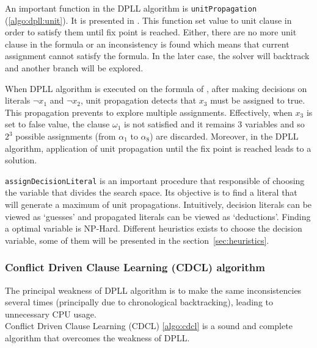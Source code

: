 

An important function in the DPLL algorithm is \texttt{unitPropagation} (\cref{algo:dpll:unit}).
It is presented in . This function set value to unit clause in order to satisfy them
until fix point is reached. Either, there
 are no more unit clause in the formula or an inconsistency 
is found which means that current assignment cannot satisfy the formula. In the later case, the solver will
backtrack and another branch will be explored.



When DPLL algorithm is executed on the formula of , after making decisions on literals
$\neg x_1$ and $\neg x_2$, unit propagation detects that $x_3$ must be assigned to true.
This propagation prevents to explore  multiple assignments. Effectively, when $x_3$ is set to false value,
the clause $\omega_1$ is not satisfied and it remains 3 variables and so $2^3$ possible assignments
(from $\alpha_1$ to $\alpha_8$) are discarded.
Moreover, in the DPLL algorithm, application of unit propagation until the fix point is reached leads  to a solution.

\texttt{assignDecisionLiteral} is an important procedure that responsible of choosing the variable that
divides the search space. Its objective is to find a literal that will generate a maximum of unit propagations. Intuitively, decision literals can be viewed as ‘guesses’ and propagated literals can be viewed as ‘deductions’. 
Finding a optimal variable is NP-Hard. Different heuristics exists to choose the decision variable,
some of them will be presented in the section~\ref{sec:heuristics}.

%
%
\subsubsection{Conflict Driven Clause Learning (CDCL) algorithm}\label{sec:cdcl}
The principal weakness of DPLL algorithm is to make the same inconsistencies several times
(principally due to chronological backtracking), leading to  unnecessary CPU usage.\\
Conflict Driven Clause Learning (CDCL) \cref{algo:cdcl} is a sound and complete algorithm
that overcomes the weakness of DPLL.

